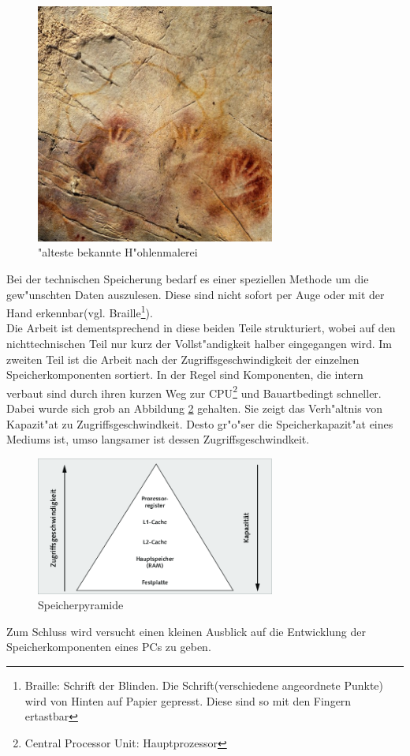 \begin{figure}[ht]
\centering
\includegraphics[width=0.7\textwidth]{images/hohlenmalerei.jpeg} 
\caption{"alteste bekannte H"ohlenmalerei}
\label{fig:hohlenmalerei}
\end{figure}

Bei der technischen Speicherung bedarf es einer speziellen Methode um die gew"unschten Daten auszulesen. Diese sind nicht sofort per Auge oder mit der Hand erkennbar(vgl. Braille\footnote{Braille: Schrift der Blinden. Die Schrift(verschiedene angeordnete Punkte) wird von Hinten auf Papier gepresst. Diese sind so mit den Fingern ertastbar}). 
\\
Die Arbeit ist dementsprechend in diese beiden Teile strukturiert, wobei auf den nichttechnischen Teil nur kurz der Vollst"andigkeit halber eingegangen wird.
Im zweiten Teil ist die Arbeit nach der Zugriffsgeschwindigkeit der einzelnen Speicherkomponenten sortiert. In der Regel sind Komponenten, die intern verbaut sind durch ihren kurzen Weg zur CPU\footnote{Central Processor Unit: Hauptprozessor} und Bauartbedingt schneller.
\\
Dabei wurde sich grob an Abbildung \ref{fig:geschPyr} gehalten. Sie zeigt das Verh"altnis von Kapazit"at zu Zugriffsgeschwindkeit. Desto gr"o"ser die Speicherkapazit"at eines Mediums ist, umso langsamer ist dessen Zugriffsgeschwindkeit. 
\begin{figure}[ht]
\centering
\includegraphics[width=0.7\textwidth]{images/speicherpyramide} 
\caption{\glqq Speicherpyramide\grqq{}}
\label{fig:geschPyr}
\end{figure}

Zum Schluss wird versucht einen kleinen Ausblick auf die Entwicklung der Speicherkomponenten eines PCs zu geben.


